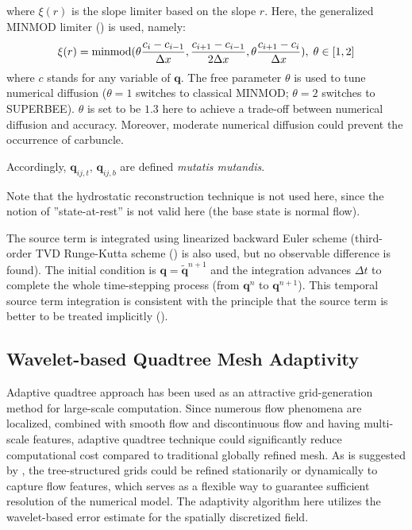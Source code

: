 \documentclass{jfm}
\begin{document}
where $\xi(r)$ is the slope limiter based on the slope $r$.
Here, the generalized MINMOD limiter (\cite{Kurganov2002b}) is used, namely:
\begin{equation}
\xi(r) = {\rm{minmod}}(\theta\frac{c_i-c_{i-1}}{\Delta x},  \frac{c_{i+1}-c_{i-1}}{2\Delta x},  \theta\frac{c_{i+1}-c_i}{\Delta x}),\;\theta \in [1,2]
\label{gminmod}
\end{equation}
where $c$ stands for any variable of $\pmb{q}$. The free parameter $\theta$ is used to tune numerical diffusion ($\theta=1$ switches to classical MINMOD; $\theta=2$ switches to SUPERBEE). $\theta$ is set to be $1.3$ here to achieve a trade-off between numerical diffusion and accuracy. Moreover, moderate numerical diffusion could prevent the occurrence of carbuncle.


Accordingly, $\pmb{q}_{ij,t},\,\pmb{q}_{ij,b}$ are defined \textit{mutatis mutandis}.

Note that the hydrostatic reconstruction technique is not used here, since the notion of  ''state-at-rest'' is not valid here (the base state is normal flow).

The source term is integrated using  linearized backward Euler scheme (third-order TVD Runge-Kutta scheme (\cite{Shu1988}) is also used, but no observable difference is found).  The initial condition is $\pmb{q}=\tilde{\pmb{q}}^{n+1}$ and the integration advances $\Delta t$ to complete the whole time-stepping process (from $\pmb{q}^{n}$ to $\pmb{q}^{n+1}$). This temporal source term integration is consistent with the principle that the source term is better to be treated implicitly (\cite{Pareschi2005}).

\subsection{Wavelet-based Quadtree Mesh Adaptivity}
Adaptive quadtree approach has been used as an attractive grid-generation method for large-scale computation. Since numerous flow phenomena are localized, combined with smooth flow and discontinuous flow and having multi-scale features, adaptive quadtree technique could significantly reduce computational cost compared to traditional globally refined mesh. As is suggested by  \cite{Popinet2003}, the  tree-structured grids could be refined stationarily or dynamically to capture flow features, which serves as a flexible way to guarantee sufficient resolution of the numerical model. The adaptivity algorithm here utilizes the wavelet-based error estimate for the spatially discretized field. 
\end{document}

